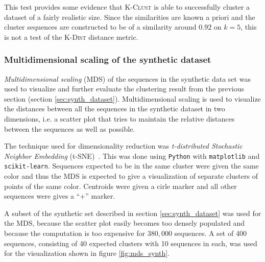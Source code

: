 
This test provides some evidence that \textsc{K-Clust} is able to successfully
cluster a dataset of a fairly realistic size. Since the similarities are known
a priori and the cluster sequences are constructed to be of a similarity around
$0.92$ on $k=5$, this is not a test of the \textsc{K-Dist} distance metric.


\subsubsection{Multidimensional scaling of the synthetic dataset}
\label{sec:mds_synth}

\emph{Multidimensional scaling} (MDS) of the sequences in the synthetic data
set was used to visualize and further evaluate the clustering result from the
previous section (section \ref{sec:synth_dataset}). Multidimensional scaling
is used to visualize the distances between all the sequences in the synthetic
dataset in two dimensions, i.e. a scatter plot that tries to maintain the
relative distances between the sequences as well as possible.

The technique used for dimensionality reduction was \emph{t-distributed
Stochastic Neighbor Embedding} (t-SNE)~\cite{maaten}. This was done using
\texttt{Python} with \texttt{matplotlib} and \texttt{scikit-learn}. Sequences
expected to be in the same cluster were given the same color and thus the MDS
is expected to give a visualization of separate clusters of points of the same
color. Centroids were given a cirle marker and all other sequences were gives a
``+'' marker.

A subset of the synthetic set described in section \ref{sec:synth_dataset} was
used for the MDS, because the scatter plot easily becomes too densely populated
and because the computation is too expensive for $380,000$ sequences. A set of
400 sequences, consisting of 40 expected clusters with 10 sequences in each,
was used for the visualization shown in figure \ref{fig:mds_synth}.

